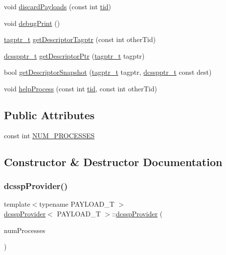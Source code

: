 \begin{DoxyCompactItemize}
\item 
void \hyperlink{classdcsspProvider_acf82fd0abf6dce78c3c31bb503ef921b}{discard\+Payloads} (const int \hyperlink{microbench_2main_8cpp_a9ca9869868fe7e7a38a921cc7de4103f}{tid})
\item 
void \hyperlink{classdcsspProvider_a4d51e86af02bf4785da7ffc395d6bce0}{debug\+Print} ()
\item 
\hyperlink{descriptors_8h_afd8a7b57046ed96897cda907f17737a7}{tagptr\+\_\+t} \hyperlink{classdcsspProvider_ae7a68531e2f3ab76bc0b9a43cc5d4d8a}{get\+Descriptor\+Tagptr} (const int other\+Tid)
\item 
\hyperlink{dcss__plus_8h_ad9478df19b8b267f41952068562989c0}{dcsspptr\+\_\+t} \hyperlink{classdcsspProvider_a93e0873a5c292e4b76eed06189f4c8ce}{get\+Descriptor\+Ptr} (\hyperlink{descriptors_8h_afd8a7b57046ed96897cda907f17737a7}{tagptr\+\_\+t} tagptr)
\item 
bool \hyperlink{classdcsspProvider_af0d2e30cfa0cd93a7ee7b0566c8f8c79}{get\+Descriptor\+Snapshot} (\hyperlink{descriptors_8h_afd8a7b57046ed96897cda907f17737a7}{tagptr\+\_\+t} tagptr, \hyperlink{dcss__plus_8h_ad9478df19b8b267f41952068562989c0}{dcsspptr\+\_\+t} const dest)
\item 
void \hyperlink{classdcsspProvider_a61cf233d6fa18ba060af91a053ad87a6}{help\+Process} (const int \hyperlink{microbench_2main_8cpp_a9ca9869868fe7e7a38a921cc7de4103f}{tid}, const int other\+Tid)
\end{DoxyCompactItemize}
\subsection*{Public Attributes}
\begin{DoxyCompactItemize}
\item 
const int \hyperlink{classdcsspProvider_a9ac60e159f73cc3e50fd85571b3c39a3}{N\+U\+M\+\_\+\+P\+R\+O\+C\+E\+S\+S\+ES}
\end{DoxyCompactItemize}


\subsection{Constructor \& Destructor Documentation}
\mbox{\label{classdcsspProvider_aba58711c0d9ea054185f1ce2403fbfd8}} 
\subsubsection{\texorpdfstring{dcssp\+Provider()}{dcsspProvider()}}
{\footnotesize\ttfamily template$<$typename P\+A\+Y\+L\+O\+A\+D\+\_\+T $>$ \\
\hyperlink{classdcsspProvider}{dcssp\+Provider}$<$ P\+A\+Y\+L\+O\+A\+D\+\_\+T $>$\+::\hyperlink{classdcsspProvider}{dcssp\+Provider} (\begin{DoxyParamCaption}\item[{const int}]{num\+Processes }\end{DoxyParamCaption})}

